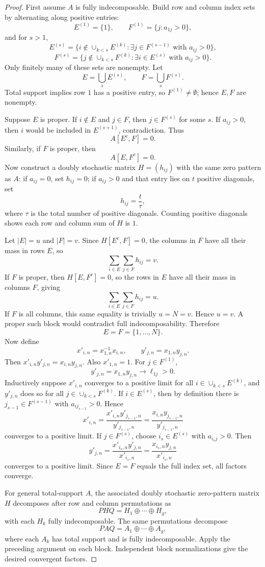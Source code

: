 \begin{proof}
First assume \(A\) is fully indecomposable.  Build row and column index sets by alternating along positive entries:
\[
  E^{(1)}=\{1\},
  \qquad
  F^{(1)}=\{j:a_{1j}>0\},
\]
and for \(s>1\),
\[
  E^{(s)}=\{i\notin \cup_{k<s}E^{(k)}:\exists j\in F^{(s-1)}\text{ with }a_{ij}>0\},
\]
\[
  F^{(s)}=\{j\notin \cup_{k<s}F^{(k)}:\exists i\in E^{(s)}\text{ with }a_{ij}>0\}.
\]
Only finitely many of these sets are nonempty.  Let
\[
  E=\bigcup_s E^{(s)},
  \qquad
  F=\bigcup_s F^{(s)}.
\]
Total support implies row \(1\) has a positive entry, so \(F^{(1)}\ne\emptyset\); hence \(E,F\) are nonempty.

Suppose \(E\) is proper.  If \(i\notin E\) and \(j\in F\), then \(j\in F^{(s)}\) for some \(s\).  If \(a_{ij}>0\), then \(i\) would be included in \(E^{(s+1)}\), contradiction.  Thus
\[
  A[E^c,F]=0.
\]
Similarly, if \(F\) is proper, then
\[
  A[E,F^c]=0.
\]
Now construct a doubly stochastic matrix \(H=(h_{ij})\) with the same zero pattern as \(A\): if \(a_{ij}=0\), set \(h_{ij}=0\); if \(a_{ij}>0\) and that entry lies on \(t\) positive diagonals, set
\[
  h_{ij}=\frac{t}{\tau},
\]
where \(\tau\) is the total number of positive diagonals.  Counting positive diagonals shows each row and column sum of \(H\) is \(1\).

Let \(|E|=u\) and \(|F|=v\).  Since \(H[E^c,F]=0\), the columns in \(F\) have all their mass in rows \(E\), so
\[
  \sum_{i\in E}\sum_{j\in F}h_{ij}=v.
\]
If \(F\) is proper, then \(H[E,F^c]=0\), so the rows in \(E\) have all their mass in columns \(F\), giving
\[
  \sum_{i\in E}\sum_{j\in F}h_{ij}=u.
\]
If \(F\) is all columns, this same equality is trivially \(u=N=v\).  Hence \(u=v\).  A proper such block would contradict full indecomposability.  Therefore
\[
  E=F=\{1,
\ldots,N\}.
\]
Now define
\[
  x'_{i,n}=x_{1,n}^{-1}x_{i,n},
  \qquad
  y'_{j,n}=x_{1,n}y_{j,n}.
\]
Then \(x'_{i,n}y'_{j,n}=x_{i,n}y_{j,n}\).  Also \(x'_{1,n}=1\).  For \(j\in F^{(1)}\),
\[
  y'_{j,n}=x_{1,n}y_{j,n}\to\ell_{1j}>0.
\]
Inductively suppose \(x'_{i,n}\) converges to a positive limit for all \(i\in\cup_{k<s}E^{(k)}\), and \(y'_{j,n}\) does so for all \(j\in\cup_{k<s}F^{(k)}\).  If \(i\in E^{(s)}\), then by definition there is \(j_{s-1}\in F^{(s-1)}\) with \(a_{ij_{s-1}}>0\).  Hence
\[
  x'_{i,n}=\frac{x'_{i,n}y'_{j_{s-1},n}}{y'_{j_{s-1},n}}
  =\frac{x_{i,n}y_{j_{s-1},n}}{y'_{j_{s-1},n}}
\]
converges to a positive limit.  If \(j\in F^{(s)}\), choose \(i_s\in E^{(s)}\) with \(a_{i_sj}>0\).  Then
\[
  y'_{j,n}=\frac{x'_{i_s,n}y'_{j,n}}{x'_{i_s,n}}
  =\frac{x_{i_s,n}y_{j,n}}{x'_{i_s,n}}
\]
converges to a positive limit.  Since \(E=F\) equals the full index set, all factors converge.

For general total-support \(A\), the associated doubly stochastic zero-pattern matrix \(H\) decomposes after row and column permutations as
\[
  PHQ=H_1\oplus\cdots\oplus H_g,
\]
with each \(H_k\) fully indecomposable.  The same permutations decompose
\[
  PAQ=A_1\oplus\cdots\oplus A_g,
\]
where each \(A_k\) has total support and is fully indecomposable.  Apply the preceding argument on each block.  Independent block normalizations give the desired convergent factors.
\end{proof}

